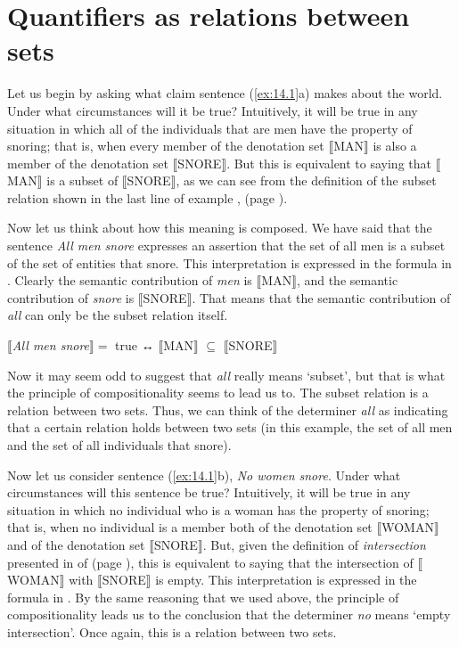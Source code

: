 \section{Quantifiers as relations between sets}\label{sec:14.2}

Let us begin by asking what claim sentence (\ref{ex:14.1}a) makes about the world. Under what circumstances will it be true? Intuitively, it will be true in any situation in which all of the individuals that are men have the property of snoring; that is, when every member of the denotation set $\llbracket$MAN$\rrbracket$  is also a member of the denotation set $\llbracket$SNORE$\rrbracket$. But this is equivalent to saying that $\llbracket$MAN$\rrbracket$  is a subset of $\llbracket$SNORE$\rrbracket$, as we can see from the definition of the subset relation shown in the last line of example ,  (page \pageref{extab:13.19}).



Now let us think about how this meaning is composed. We have said that the sentence \textit{All men snore} expresses an assertion that the set of all men is a subset of the set of entities that snore. This interpretation is expressed in the formula in . Clearly the semantic contribution of \textit{men} is $\llbracket$MAN$\rrbracket$, and the semantic contribution of \textit{snore} is $\llbracket$SNORE$\rrbracket$. That means that the semantic contribution of \textit{all} can only be the subset relation itself.


\ea \label{ex:14.2}
{}$\llbracket$\textit{All men snore}$\rrbracket =$ true ↔  $\llbracket$MAN$\rrbracket$  ${\subseteq}$ $\llbracket$SNORE$\rrbracket$ 
\z


Now it may seem odd to suggest that \textit{all} really means ‘subset’, but that is what the principle of compositionality seems to lead us to. The subset relation is a relation between two sets. Thus, we can think of the determiner \textit{all} as indicating that a certain relation holds between two sets (in this example, the set of all men and the set of all individuals that snore).



Now let us consider sentence (\ref{ex:14.1}b), \textit{No women snore}. Under what circumstances will this sentence be true? Intuitively, it will be true in any situation in which no individual who is a woman has the property of snoring; that is, when no individual is a member both of the denotation set $\llbracket$WOMAN$\rrbracket$  and of the denotation set $\llbracket$SNORE$\rrbracket$. But, given the definition of \textit{intersection} presented in  of  (page \pageref{extab:13.19}), this is equivalent to saying that the intersection of $\llbracket$WOMAN$\rrbracket$  with $\llbracket$SNORE$\rrbracket$  is empty. This interpretation is expressed in the formula in . By the same reasoning that we used above, the principle of compositionality leads us to the conclusion that the determiner \textit{no} means ‘empty intersection’. Once again, this is a relation between two sets.


